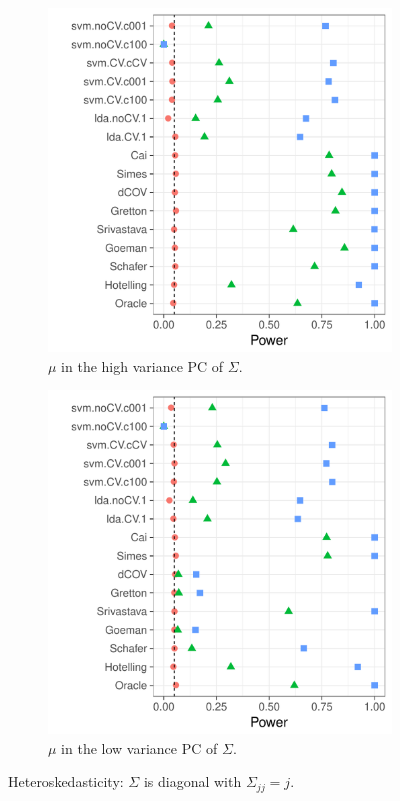 \documentclass[]{bio}
\begin{document}
\begin{figure}[h]
	\centering
	\begin{subfigure}[t]{.45\columnwidth}
		\centering
		\includegraphics[width=1\columnwidth]{"art/file26"}
		\caption{$\mu$ in the high variance PC of $\Sigma$.}  
		\label{fig:heteroskedastic_11}	
	\end{subfigure}
	\begin{subfigure}[t]{0.45\columnwidth}
		\centering
		\includegraphics[width=1\columnwidth]{"art/file24"}
		\caption{$\mu$ in the low variance PC of $\Sigma$.}  
		\label{fig:heteroskedastic_12}	
	\end{subfigure}
	\caption{Heteroskedasticity: $\Sigma$ is diagonal with $\Sigma_{jj}=j$.}	
	\label{fig:heteroskedastic}	
\end{figure}
\end{document}
